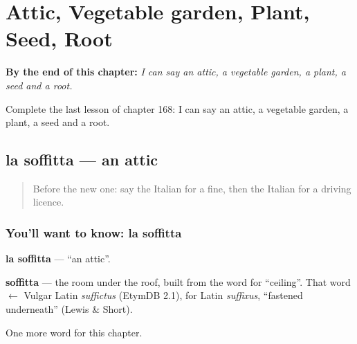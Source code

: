 
\chapter{Attic, Vegetable garden, Plant, Seed, Root}
\label{ch:it-attic-vegetable-garden-plant-seed-root}

\begin{chapteropening}
\textbf{By the end of this chapter:} \emph{I can say an attic, a vegetable garden, a plant, a seed and a root.}

Complete the last lesson of chapter 168: I can say an attic, a vegetable garden, a plant, a seed and a root.
\end{chapteropening}

\section[la soffitta]{la soffitta — an attic}

\label{lesson:IT-C168-soffitta}



\begin{quote}
Before the new one: say the Italian for a fine, then the Italian for a driving licence.
\end{quote}

\subsection*{You'll want to know: la soffitta}
\textbf{la soffitta} — \textquotedblleft{}an attic\textquotedblright{}.

\begin{cousinweb}
\textbf{soffitta} — the room under the roof, built from the word for \textquotedblleft{}ceiling\textquotedblright{}. That word $\leftarrow$ Vulgar Latin \emph{suffictus} (EtymDB 2.1), for Latin \emph{suffixus}, \textquotedblleft{}fastened underneath\textquotedblright{} (Lewis \& Short).
\end{cousinweb}

\begin{grammarlens}[title={What you've built}]
One more word for this chapter.
\end{grammarlens}

